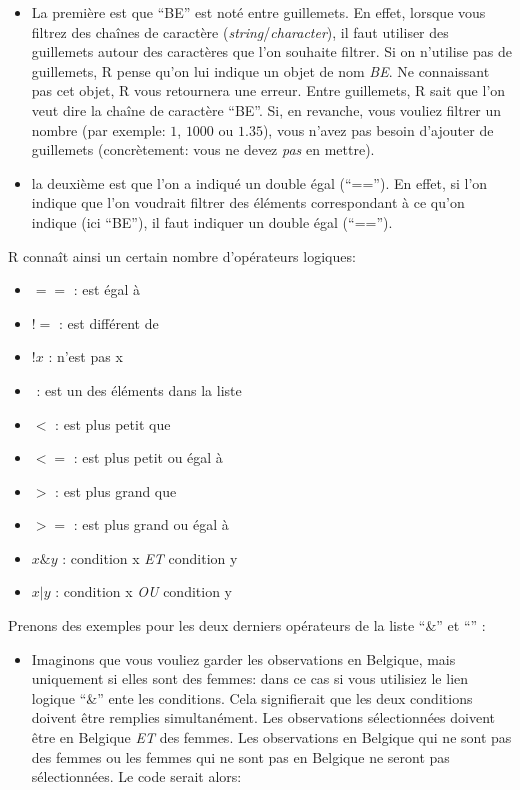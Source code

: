 \documentclass[
]{book}
\providecommand{\tightlist}{%
  \setlength{\itemsep}{0pt}\setlength{\parskip}{0pt}}
\begin{document}
\begin{itemize}
\item
  La première est que ``BE'' est noté entre guillemets. En effet, lorsque vous filtrez des chaînes de caractère (\emph{string}/\emph{character}), il faut utiliser des guillemets autour des caractères que l'on souhaite filtrer. Si on n'utilise pas de guillemets, R pense qu'on lui indique un objet de nom \emph{BE}. Ne connaissant pas cet objet, R vous retournera une erreur. Entre guillemets, R sait que l'on veut dire la chaîne de caractère ``BE''. Si, en revanche, vous vouliez filtrer un nombre (par exemple: \(1\), \(1000\) ou \(1.35\)), vous n'avez pas besoin d'ajouter de guillemets (concrètement: vous ne devez \emph{pas} en mettre).
\item
  la deuxième est que l'on a indiqué un double égal (``==''). En effet, si l'on indique que l'on voudrait filtrer des éléments correspondant à ce qu'on indique (ici ``BE''), il faut indiquer un double égal (``=='').
\end{itemize}

R connaît ainsi un certain nombre d'opérateurs logiques:

\begin{itemize}
\tightlist
\item
  \(==\) : est égal à
\item
  \(!=\) : est différent de
\item
  \(!x\) : n'est pas x
\item
  \(%
  \) : est un des éléments dans la liste
\item
  \(<\) : est plus petit que
\item
  \(<=\) : est plus petit ou égal à
\item
  \(>\) : est plus grand que
\item
  \(>=\) : est plus grand ou égal à
\item
  \(x \& y\) : condition x \emph{ET} condition y
\item
  \(x | y\) : condition x \emph{OU} condition y
\end{itemize}

Prenons des exemples pour les deux derniers opérateurs de la liste ``\&'' et ``\textbar{}'' :

\begin{itemize}
\tightlist
\item
  Imaginons que vous vouliez garder les observations en Belgique, mais uniquement si elles sont des femmes: dans ce cas si vous utilisiez le lien logique ``\&'' ente les conditions. Cela signifierait que les deux conditions doivent être remplies simultanément. Les observations sélectionnées doivent être en Belgique \emph{ET} des femmes. Les observations en Belgique qui ne sont pas des femmes ou les femmes qui ne sont pas en Belgique ne seront pas sélectionnées. Le code serait alors:
\end{itemize}
\end{document}
